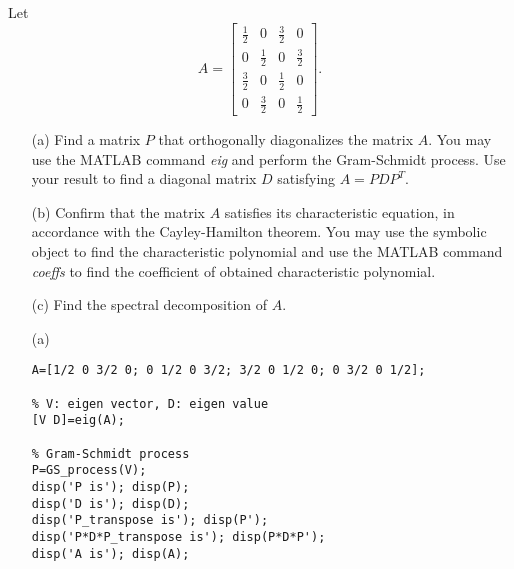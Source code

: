 \begin{exer}
\begin{enumerate}
Let
$$A=\begin{bmatrix}\frac{1}{2} & 0 & \frac{3}{2} & 0 \\ 0 & \frac{1}{2} & 0 & \frac{3}{2} \\ \frac{3}{2} & 0 & \frac{1}{2} & 0 \\ 0 & \frac{3}{2} & 0 & \frac{1}{2}\end{bmatrix}.$$
\begin{enumerate}
\item[(a)]
Find a matrix $P$ that orthogonally diagonalizes the matrix $A$. You may use the MATLAB command \textit{eig} and perform the Gram-Schmidt process. Use your result to find a diagonal matrix $D$ satisfying $A=PDP^{T}$.
\vspace{1mm}
\item[(b)]
Confirm that the matrix $A$ satisfies its characteristic equation, in accordance with the Cayley-Hamilton theorem. You may use the symbolic object to find the characteristic polynomial and use the MATLAB command \textit{coeffs} to find the coefficient of obtained characteristic polynomial.
\vspace{1mm}
\item[(c)]
Find the spectral decomposition of $A$.
\end{enumerate}
\end{enumerate}


\begin{sol}
\verb""
\begin{enumerate}
\item[(a)]
\begin{verbatim}
A=[1/2 0 3/2 0; 0 1/2 0 3/2; 3/2 0 1/2 0; 0 3/2 0 1/2];

% V: eigen vector, D: eigen value
[V D]=eig(A);

% Gram-Schmidt process
P=GS_process(V);    
disp('P is'); disp(P);
disp('D is'); disp(D);
disp('P_transpose is'); disp(P');
disp('P*D*P_transpose is'); disp(P*D*P');
disp('A is'); disp(A);
\end{verbatim}


\begin{outputs}

\begin{verbatim}


\end{verbatim}
\end{outputs}
\end{enumerate}
\end{sol}
\end{exer}
